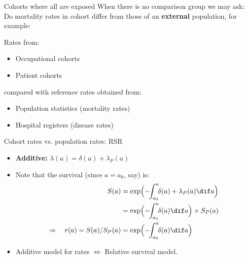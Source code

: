 \begin{frame}{Cohorts where all are exposed}
When there is no comparison group we may ask:\\
Do mortality rates in cohort differ from those of an
\textbf{external} population, for example:

Rates from:
\begin{itemize}
\item Occupational cohorts
\item Patient cohorts
\end{itemize}
compared with reference rates obtained from:
\begin{itemize}
\item Population statistics (mortality rates)
\item Hospital registers (disease rates)
\end{itemize}
\end{frame}

\begin{frame}{Cohort rates vs. population rates: RSR}
  \begin{itemize}
  \item \textbf{Additive:} $\lambda(a) = \delta(a) + \lambda_P(a)$
  \item Note that the survival (since $a=a_0$, say) is: \vspace*{-1ex}
\begin{align*}
     S(a) &= \exp\Bigl(-\!\!\int_{a_0}^a\!\! \delta(a) + \lambda_P(a) \dif a\Bigr)\\
          &= \exp\Bigl(-\!\!  \int_{a_0}^a\!\! \delta(a) \dif a\Bigr) \times S_P(a)\\
    \Rightarrow \quad
    r(a) = S(a)/S_P(a) &= \exp\Bigl(-\!\!\int_{a_0}^a\!\! \delta(a) \dif a\Bigr)
  \end{align*}

  \item Additive model for rates $\Leftrightarrow$ Relative survival model.
  \end{itemize}
\end{frame}


